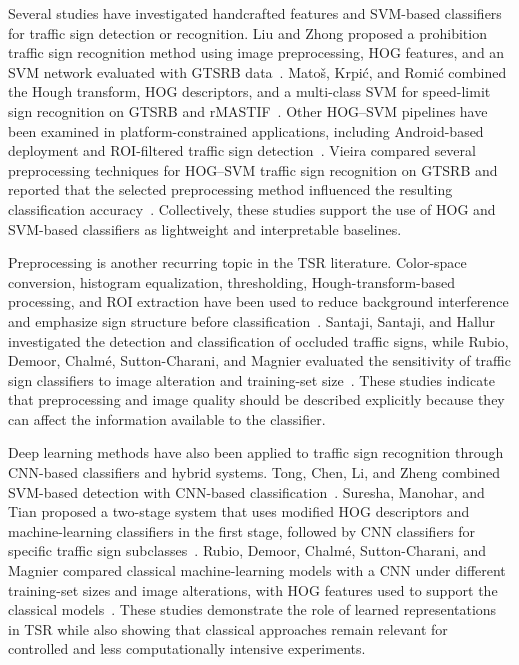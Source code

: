 \documentclass[conference]{IEEEtran}
\begin{document}
Several studies have investigated handcrafted features and SVM-based classifiers for traffic sign detection or recognition. Liu and Zhong proposed a prohibition traffic sign recognition method using image preprocessing, HOG features, and an SVM network evaluated with GTSRB data~\cite{liu2022hogsvm}. Mato\v{s}, Krpi\'c, and Romi\'c combined the Hough transform, HOG descriptors, and a multi-class SVM for speed-limit sign recognition on GTSRB and rMASTIF~\cite{matos2019speedlimit}. Other HOG--SVM pipelines have been examined in platform-constrained applications, including Android-based deployment and ROI-filtered traffic sign detection~\cite{qiang2017android,cojocariu2018hogsvm}. Vieira compared several preprocessing techniques for HOG--SVM traffic sign recognition on GTSRB and reported that the selected preprocessing method influenced the resulting classification accuracy~\cite{vieira2025preprocessing}. Collectively, these studies support the use of HOG and SVM-based classifiers as lightweight and interpretable baselines.

Preprocessing is another recurring topic in the TSR literature. Color-space conversion, histogram equalization, thresholding, Hough-transform-based processing, and ROI extraction have been used to reduce background interference and emphasize sign structure before classification~\cite{tong2017svmcnn,matos2019speedlimit,agrawal2017moment,junges2019brazilian,ayaou2020hough}. Santaji, Santaji, and Hallur investigated the detection and classification of occluded traffic signs, while Rubio, Demoor, Chalm\'e, Sutton-Charani, and Magnier evaluated the sensitivity of traffic sign classifiers to image alteration and training-set size~\cite{santaji2018occluded,rubio2024sensitivity}. These studies indicate that preprocessing and image quality should be described explicitly because they can affect the information available to the classifier.

Deep learning methods have also been applied to traffic sign recognition through CNN-based classifiers and hybrid systems. Tong, Chen, Li, and Zheng combined SVM-based detection with CNN-based classification~\cite{tong2017svmcnn}. Suresha, Manohar, and Tian proposed a two-stage system that uses modified HOG descriptors and machine-learning classifiers in the first stage, followed by CNN classifiers for specific traffic sign subclasses~\cite{suresha2024twostage}. Rubio, Demoor, Chalm\'e, Sutton-Charani, and Magnier compared classical machine-learning models with a CNN under different training-set sizes and image alterations, with HOG features used to support the classical models~\cite{rubio2024sensitivity}. These studies demonstrate the role of learned representations in TSR while also showing that classical approaches remain relevant for controlled and less computationally intensive experiments.
\end{document}
